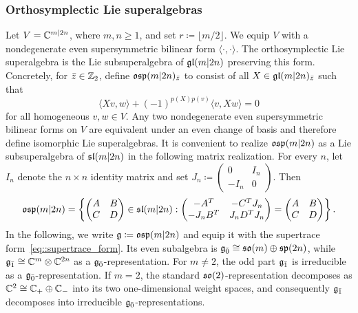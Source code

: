 \subsubsection{Orthosymplectic Lie superalgebras} Let $V=\CC ^{m\vert 2n}$, where $m,n\geq1$, and set $r\coloneqq\lfloor m/2\rfloor$. We equip $V$ with a nondegenerate even supersymmetric bilinear form $\langle\cdot,\cdot\rangle$. The orthosymplectic Lie superalgebra is the Lie subsuperalgebra of $\gl(m\vert 2n)$ preserving this form. Concretely, for $\bar z\in\ZZ_2$, define $\osp(m\vert 2n)_{\bar z}$ to consist of all
$X\in\gl(m\vert 2n)_{\bar z}$ such that
\begin{equation}
\langle Xv,w\rangle
+
(-1)^{p(X)p(v)}
\langle v,Xw\rangle
=0
\end{equation}
for all homogeneous $v,w\in V$. Any two nondegenerate even supersymmetric bilinear forms on $V$ are equivalent under an even change of basis and therefore define isomorphic Lie superalgebras. It is convenient to realize $\osp(m\vert 2n)$ as a Lie subsuperalgebra of
$\sl(m\vert 2n)$ in the following matrix realization. For every $n$, let
$I_n$ denote the $n\times n$ identity matrix and set
$
J_n\coloneqq
\left(
\begin{smallmatrix}
0&I_n\\
-I_n&0
\end{smallmatrix}
\right).$ Then
\begin{equation}
\osp(m\vert 2n)
=
\left\{
\begin{pmatrix}
A&B\\
C&D
\end{pmatrix}
\in\sl(m\vert 2n)
:
\begin{pmatrix}
-A^T&-C^TJ_n\\
-J_nB^T&J_nD^TJ_n
\end{pmatrix}
=
\begin{pmatrix}
A&B\\
C&D
\end{pmatrix}
\right\}.
\end{equation}
In the following, we write $\gg\coloneqq\osp(m\vert 2n)$ and equip it with the
supertrace form~\eqref{eq::supertrace_form}. Its even subalgebra is
$\even\cong\so(m)\oplus\sp(2n)$, while
$\odd\cong\CC^m\otimes\CC^{2n}$ as a $\even$-representation. For
$m\neq2$, the odd part $\odd$ is irreducible as a $\even$-representation.
If $m=2$, the standard $\so(2)$-representation decomposes as
$\CC^2\cong\CC_{+}\oplus\CC_{-}$ into its two one-dimensional weight
spaces, and consequently $\odd$ decomposes into irreducible $\even$-representations.

